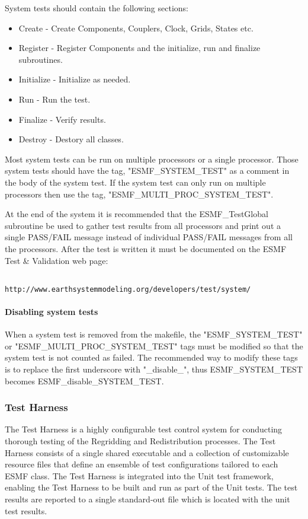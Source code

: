 System tests should contain the following sections:
\begin{itemize}
\item Create - Create Components, Couplers, Clock, Grids, States etc.
\item Register - Register Components and the initialize, run and finalize subroutines.
\item Initialize - Initialize as needed.
\item Run - Run the test.
\item Finalize - Verify results.
\item Destroy - Destory all classes.
\end{itemize}

Most system tests can be run on multiple processors or a single processor. Those system tests should
have the tag, "ESMF\_SYSTEM\_TEST" as a comment in the body of the system test. If the system test
can only run on multiple processors then use the tag, "ESMF\_MULTI\_PROC\_SYSTEM\_TEST".

At the end of the system it is recommended that the ESMF\_TestGlobal subroutine be used to gather
test results from all processors and print out a single PASS/FAIL message instead
of individual PASS/FAIL messages from all the processors.
After the test is written it must be documented on the ESMF Test \& Validation
web page:

\begin{verbatim}

http://www.earthsystemmodeling.org/developers/test/system/

\end{verbatim}


\begin{sloppypar}
\paragraph{Disabling system tests}
When a system test is removed from the makefile, the "ESMF\_SYSTEM\_TEST" or 
"ESMF\_MULTI\_PROC\_SYSTEM\_TEST"
tags must be modified so that the system test is not counted as failed. 
The recommended way to modify these tags is to replace the first underscore with "\_disable\_", thus 
ESMF\_SYSTEM\_TEST becomes 
ESMF\_disable\_SYSTEM\_TEST.
\end{sloppypar}

\subsubsection{Test Harness}
The Test Harness is a highly configurable test control system for conducting 
thorough testing of the Regridding and Redistribution processes. The Test Harness 
consists of a single shared executable and a collection of customizable resource
files that define an ensemble of test configurations tailored to each ESMF class.
The Test Harness is integrated into the Unit test framework, enabling
the Test Harness to be built and run as part of the Unit tests. The test results 
are reported to a single standard-out file which is located with the unit test 
results.

